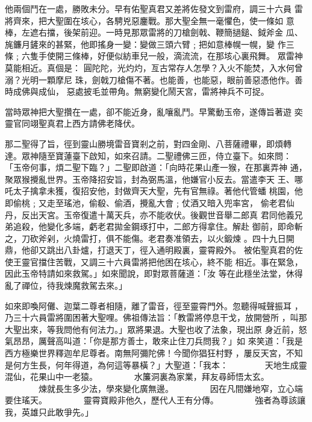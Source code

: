 \begin{pinyinscope}
{他兩個鬥在一處，勝敗未分。早有佑聖真君又差將佐發文到雷府，調三十六員
雷將齊來，把大聖圍在垓心，各騁兇惡鏖戰。那大聖全無一毫懼色，使一條如
意棒，左遮右擋，後架前迎。一時見那眾雷將的刀槍劍戟、鞭簡撾鎚、鉞斧金
瓜、旄鐮月鏟來的甚緊，他即搖身一變：變做三頭六臂﹔把如意棒幌一幌，變
作三條﹔六隻手使開三條棒，好便似紡車兒一般，滴流流，在那垓心裏飛舞。
眾雷神莫能相近。真個是：
圓陀陀，光灼灼，亙古常存人怎學？入火不能焚，入水何曾溺？光明一顆摩尼
珠，劍戟刀槍傷不著。也能善，也能惡，眼前善惡憑他作。善時成佛與成仙，
惡處披毛並帶角。無窮變化鬧天宮，雷將神兵不可捉。

當時眾神把大聖攢在一處，卻不能近身，亂嚷亂鬥。早驚動玉帝，遂傳旨著遊
奕靈官同翊聖真君上西方請佛老降伏。

那二聖得了旨，徑到靈山勝境雷音寶剎之前，對四金剛、八菩薩禮畢，即煩轉
達。眾神隨至寶蓮臺下啟知，如來召請。二聖禮佛三匝，侍立臺下。如來問：
「玉帝何事，煩二聖下臨？」二聖即啟道：「向時花果山產一猴，在那裏弄神
通，聚眾猴攪亂世界。玉帝降招安旨，封為弼馬溫，他嫌官小反去。當遣李天
王、哪吒太子擒拿未獲，復招安他，封做齊天大聖，先有官無祿。著他代管蟠
桃園，他即偷桃﹔又走至瑤池，偷殽、偷酒，攪亂大會﹔仗酒又暗入兜率宮，
偷老君仙丹，反出天宮。玉帝復遣十萬天兵，亦不能收伏。後觀世音舉二郎真
君同他義兄弟追殺，他變化多端，虧老君拋金鋼琢打中，二郎方得拿住。解赴
御前，即命斬之，刀砍斧剁，火燒雷打，俱不能傷。老君奏准領去，以火鍛煉
。四十九日開鼎，他卻又跳出八卦爐，打退天丁，徑入通明殿裏，靈霄殿外。
被佑聖真君的佐使王靈官擋住苦戰，又調三十六員雷將把他困在垓心，終不能
相近。事在緊急，因此玉帝特請如來救駕。」如來聞說，即對眾菩薩道：「汝
等在此穩坐法堂，休得亂了禪位，待我煉魔救駕去來。」

如來即喚阿儺、迦葉二尊者相隨，離了雷音，徑至靈霄門外。忽聽得喊聲振耳
，乃三十六員雷將圍困著大聖哩。佛祖傳法旨：「教雷將停息干戈，放開營所
，叫那大聖出來，等我問他有何法力。」眾將果退。大聖也收了法象，現出原
身近前，怒氣昂昂，厲聲高叫道：「你是那方善士，敢來止住刀兵問我？」如
來笑道：「我是西方極樂世界釋迦牟尼尊者。南無阿彌陀佛！今聞你猖狂村野
，屢反天宮，不知是何方生長，何年得道，為何這等暴橫？」大聖道：「我本：
　　　　天地生成靈混仙，花果山中一老猿。
　　　　水簾洞裏為家業，拜友尋師悟太玄。
　　　　煉就長生多少法，學來變化廣無邊。
　　　　因在凡間嫌地窄，立心端要住瑤天。
　　　　靈霄寶殿非他久，歷代人王有分傳。
　　　　強者為尊該讓我，英雄只此敢爭先。」

}
\end{pinyinscope}
